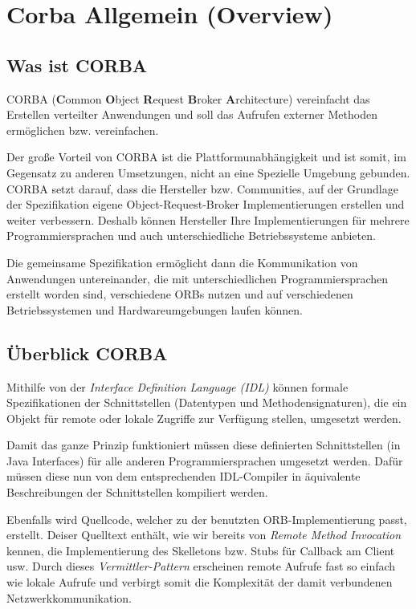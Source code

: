 \section{Corba Allgemein (Overview)}
\label{sec:Corba Allgemein (Overview)}


	\subsection{Was ist CORBA \cite{omniOrb} \cite{corbaWiki}}

	CORBA (\textbf{C}ommon \textbf{O}bject \textbf{R}equest \textbf{B}roker \textbf{A}rchitecture) vereinfacht das Erstellen verteilter Anwendungen und soll das Aufrufen externer Methoden ermöglichen bzw. vereinfachen.
	
	Der große Vorteil von CORBA ist die Plattformunabhängigkeit und ist somit, im Gegensatz zu anderen Umsetzungen, nicht an eine Spezielle Umgebung gebunden.
	CORBA setzt darauf, dass die Hersteller bzw. Communities, auf der Grundlage der Spezifikation eigene Object-Request-Broker Implementierungen erstellen und weiter verbessern. Deshalb können Hersteller Ihre Implementierungen für mehrere Programmiersprachen und auch unterschiedliche Betriebssysteme anbieten.
	
	Die gemeinsame Spezifikation ermöglicht dann die Kommunikation von Anwendungen untereinander, die mit unterschiedlichen Programmiersprachen erstellt worden sind, verschiedene ORBs nutzen und auf verschiedenen Betriebssystemen und Hardwareumgebungen laufen können.
	
		\subsection{Überblick CORBA \cite{omniOrb} \cite{corbaWiki}}
		Mithilfe von der \textit{Interface Definition Language (IDL)} können formale Spezifikationen der Schnittstellen (Datentypen und Methodensignaturen), die ein Objekt für remote oder lokale Zugriffe zur Verfügung stellen, umgesetzt werden.
		
		Damit das ganze Prinzip funktioniert müssen diese definierten Schnittstellen (in Java Interfaces) für alle anderen Programmiersprachen umgesetzt werden.
		Dafür müssen diese nun von dem entsprechenden IDL-Compiler in äquivalente Beschreibungen der Schnittstellen kompiliert werden.
		
		Ebenfalls wird Quellcode, welcher zu der benutzten ORB-Implementierung passt, erstellt. Deiser Quelltext enthält, wie wir bereits von \textit{Remote Method Invocation} kennen, die Implementierung des Skelletons bzw. Stubs für Callback am Client usw. Durch dieses \textit{Vermittler-Pattern} erscheinen remote Aufrufe fast so einfach wie lokale Aufrufe und verbirgt somit die Komplexität der damit verbundenen Netzwerkkommunikation.
		
